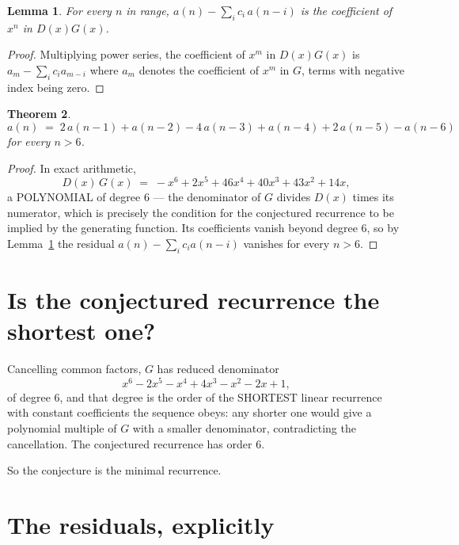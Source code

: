 \documentclass[11pt,a4paper]{article}
\theoremstyle{plain}
\newtheorem{theorem}{Theorem}
\newtheorem{lemma}[theorem]{Lemma}
\theoremstyle{definition}
\begin{document}
\begin{lemma}\label{lem:key}
For every $n$ in range, $a(n)-\sum_i c_i\,a(n-i)$ is the coefficient of $x^{n}$ in
$D(x)G(x)$.
\end{lemma}

\begin{proof}
Multiplying power series, the coefficient of $x^{m}$ in $D(x)G(x)$ is
$a_m-\sum_i c_i a_{m-i}$ where $a_m$ denotes the coefficient of $x^{m}$ in $G$, terms with
negative index being zero.
\end{proof}

\begin{theorem}
\[
a(n)\;=\;2\,a(n-1) + a(n-2) - 4\,a(n-3) + a(n-4) + 2\,a(n-5) - a(n-6)
\]
for every $n>6$.
\end{theorem}

\begin{proof}
In exact arithmetic,
\[
D(x)\,G(x)\;=\;- x^{6} + 2 x^{5} + 46 x^{4} + 40 x^{3} + 43 x^{2} + 14 x,
\]
a POLYNOMIAL of degree $6$ --- the denominator of $G$ divides $D(x)$ times its numerator,
which is precisely the condition for the conjectured recurrence to be implied by the
generating function. Its coefficients vanish beyond degree $6$, so by
Lemma~\ref{lem:key} the residual $a(n)-\sum_ic_ia(n-i)$ vanishes for every
$n>6$.
\end{proof}

\section{Is the conjectured recurrence the shortest one?}

Cancelling common factors, $G$ has reduced denominator
\[
x^{6} - 2 x^{5} - x^{4} + 4 x^{3} - x^{2} - 2 x + 1,
\]
of degree $6$, and that degree is the order of the SHORTEST linear recurrence with
constant coefficients the sequence obeys: any shorter one would give a polynomial multiple of
$G$ with a smaller denominator, contradicting the cancellation. The conjectured recurrence has
order $6$.

So the conjecture is the minimal recurrence.

\section{The residuals, explicitly}
\end{document}

